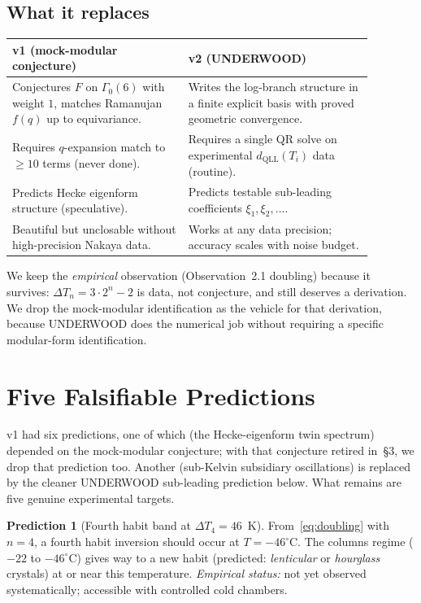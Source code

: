 \documentclass[11pt,letterpaper]{article}
\theoremstyle{plain}
\theoremstyle{definition}
\newtheorem{prediction}[theorem]{Prediction}
\begin{document}
\subsection{What it replaces}

\begin{center}
\begin{tabular}{@{}p{0.43\linewidth}p{0.45\linewidth}@{}}
\toprule
v1 (mock-modular conjecture) & v2 (UNDERWOOD) \\
\midrule
Conjectures $F$ on $\Gamma_0(6)$ with weight $1$, matches
Ramanujan $f(q)$ up to equivariance. & Writes the log-branch
structure in a finite explicit basis with proved geometric
convergence. \\
Requires $q$-expansion match to $\ge 10$ terms (never done). &
Requires a single QR solve on experimental $d_{\text{QLL}}(T_i)$
data (routine). \\
Predicts Hecke eigenform structure (speculative). & Predicts
testable sub-leading coefficients $\xi_1, \xi_2, \ldots$. \\
Beautiful but unclosable without high-precision Nakaya data. &
Works at any data precision; accuracy scales with noise budget. \\
\bottomrule
\end{tabular}
\end{center}

We keep the \emph{empirical} observation (Observation~2.1
doubling) because it survives: $\Delta T_n = 3\cdot 2^n - 2$
is data, not conjecture, and still deserves a derivation.  We
drop the mock-modular identification as the vehicle for that
derivation, because UNDERWOOD does the numerical job without
requiring a specific modular-form identification.

\section{Five Falsifiable Predictions}

v1 had six predictions, one of which (the Hecke-eigenform twin
spectrum) depended on the mock-modular conjecture; with that
conjecture retired in~\S3, we drop that prediction too.  Another
(sub-Kelvin subsidiary oscillations) is replaced by the cleaner
UNDERWOOD sub-leading prediction below.  What remains are five
genuine experimental targets.

\begin{prediction}[Fourth habit band at $\Delta T_4 = 46$~K]
\label{pred:P1}
From~\eqref{eq:doubling} with $n=4$, a fourth habit inversion
should occur at $T = -46^\circ$C.  The columns regime
($-22$ to $-46^\circ$C) gives way to a new habit (predicted:
\emph{lenticular} or \emph{hourglass} crystals) at or near this
temperature.
\emph{Empirical status:} not yet observed systematically;
accessible with controlled cold chambers.
\end{prediction}
\end{document}
